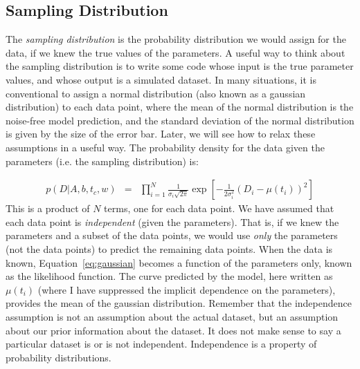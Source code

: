 \subsection{Sampling Distribution}
The {\it sampling distribution} is the probability distribution we would assign
for the data, if we knew the true values of the parameters. A useful way to
think about the sampling distribution is to write some code whose input is the
true parameter values, and whose output is a simulated dataset.
In many situations, it is conventional to assign a normal distribution
(also known as a gaussian distribution) to each data point, where the mean
of the normal distribution is the noise-free model prediction, and the
standard deviation of the normal distribution is given by the size of the
error bar. Later, we will see how to relax these assumptions in a useful way.
The probability density for the data given the parameters (i.e. the sampling
distribution) is:

\begin{eqnarray}
p(D | A, b, t_c, w) &=& \prod_{i=1}^N \frac{1}{\sigma_i \sqrt{2\pi}}
\exp\left[-\frac{1}{2\sigma_i^2}\left(D_i - \mu(t_i)\right)^2\right]\label{eq:gaussian}
\end{eqnarray}
This is a product of $N$ terms, one for each data point. We have assumed that
each data point is {\it independent} (given the parameters). That is, if we
knew the parameters and a subset of the data points, we would use {\it only} the parameters (not the data points) to predict the remaining data points.
When the data is known, Equation~\ref{eq:gaussian} becomes a
function of the parameters only, known as the likelihood function.
The curve predicted
by the model, here written as $\mu(t_i)$ (where I have suppressed the implicit
dependence on the parameters), provides the mean of the gaussian
distribution. Remember that the independence assumption is not an assumption
about the actual dataset, but an assumption
about our prior information about the dataset. It does not make sense to say
a particular dataset is or is not independent. Independence is a property of
probability distributions.

